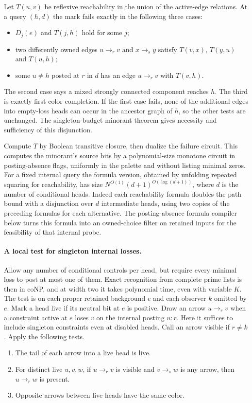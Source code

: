Let $T(u,v)$ be reflexive reachability in the
union of the active-edge relations. At a
query $(h,d)$ the mark fails exactly in the
following three cases:
\begin{itemize}
\item $D_j(e)$ and $T(j,h)$ hold for some $j$;
\item two differently owned edges $u\to_r v$
      and $x\to_s y$ satisfy $T(v,x)$, $T(y,u)$
      and $T(u,h)$;
\item some $u\ne h$ posted at $r$ in $d$
      has an edge $u\to_r v$ with $T(v,h)$.
\end{itemize}
The second case says a mixed strongly connected
component reaches $h$. The third is exactly
first-color completion. If the first case
fails, none of the additional edges into
empty-loss heads can occur in the ancestor
graph of $h$, so the other tests are unchanged.
The singleton-budget minorant theorem gives
necessity and sufficiency of this disjunction.

Compute $T$ by Boolean transitive closure,
then dualize the failure circuit. This computes
the minorant's source bits by a polynomial-size
monotone circuit in posting-absence flags,
uniformly in the palette and without listing
minimal zeros. For a fixed internal query the
formula version, obtained by unfolding repeated
squaring for reachability, has size
$N^{O(1)}(d+1)^{O(\log(d+1))}$, where $d$ is
the number of conditional heads. Indeed each
reachability formula doubles the path bound
with a disjunction over $d$ intermediate
heads, using two copies of the preceding
formulas for each alternative. The posting-absence
formula compiler below turns this formula into
an owned-choice filter on retained inputs for
the feasibility of that internal probe.

\paragraph{A local test for singleton internal losses.}
Allow any number of conditional controls per head, but
require every minimal loss to post at most one of them.
Exact recognition from complete prime lists is then in
coNP, and at width two it takes polynomial time, even
with variable $K$. The test is on each proper retained
background $e$ and each observer $k$ omitted by $e$.
Mark a head live if its neutral bit at $e$ is positive.
Draw an arrow $u\to_r v$ when a constraint active at $e$
loses $v$ on the internal posting $u:r$. Here it suffices
to include singleton constraints even at disabled heads.
Call an arrow visible if $r\ne k$.
Apply the following tests.
\begin{enumerate}
\item The tail of each arrow into a live head is live.
\item For distinct live $u,v,w$, if $u\to_r v$ is visible
and $v\to_s w$ is any arrow, then $u\to_r w$ is present.
\item Opposite arrows between live heads have the same color.
\end{enumerate}


